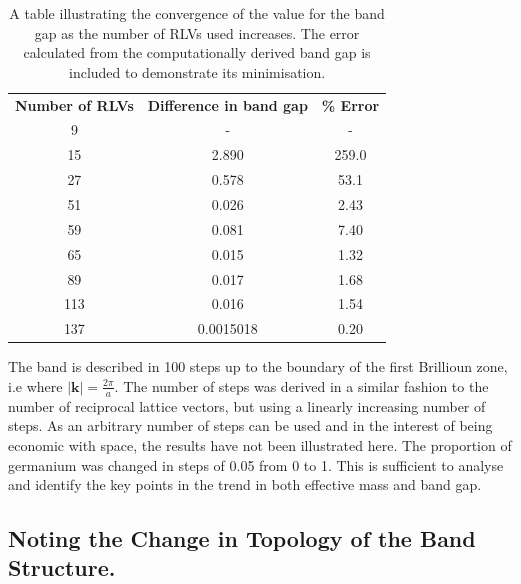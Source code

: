 \documentclass[10pt, twocolumn]{revtex4}    %
\begin{document}
\begin{table}[h!]
\begin{tabular}{|c|c|c|}
\cline{1-3}
\textbf{Number of RLVs} & \textbf{Difference in band gap} &  \textbf{\% Error} \\ \cline{1-3}
9              & -                     &-  \\ %
15             & 2.890           & 259.0 \\ %
27             & 0.578             & 53.1 \\ %
51             & 0.026            & 2.43 \\ %
59             & 0.081            & 7.40 \\ %
65             & 0.015           & 1.32 \\ %
89             & 0.017            & 1.68 \\ %
113            & 0.016             &  1.54\\ %
137            & 0.0015018             & 0.20 \\ \cline{1-3}

\end{tabular}
\caption{A table illustrating the convergence of the value for the band gap as the number of RLVs used increases. The error calculated from the computationally derived band gap is included to demonstrate its minimisation.}

\end{table}
The band is described in 100 steps up to the boundary of the first Brillioun zone, i.e where  $|\textbf{k}| = \frac{2\pi}{a}$. The number of steps was derived in a similar fashion to the number of reciprocal lattice vectors, but using a linearly increasing number of steps. As an arbitrary number of steps can be used and in the interest of being economic with space, the results have not been illustrated here.
The proportion of germanium was changed in steps of 0.05 from 0 to 1.  This is sufficient to analyse and identify the key points in the trend in both effective mass and band gap.


\subsection{Noting the Change in Topology of the Band Structure.}
\end{document}
